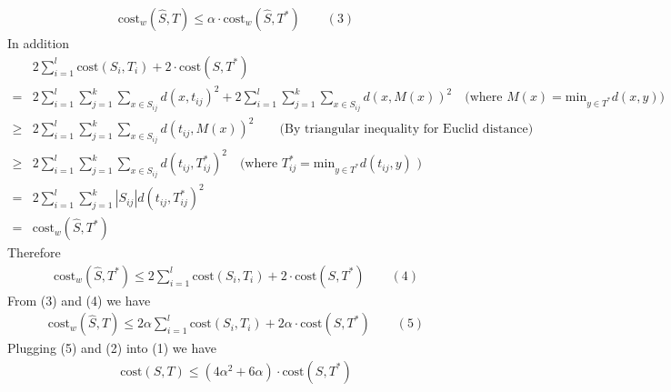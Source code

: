 \documentclass[12pt]{article}
\begin{document}
\begin{enumerate}[label=(\alph*)]
	\begin{align*}
		\text{cost}_w(\hat{S}, T) \leq \alpha \cdot \text{cost}_w(\hat{S}, T^*) \qquad (3)
	\end{align*}
	In addition
	\begin{align*}
		&2\sum_{i=1}^l\text{cost}(S_i, T_i) + 2 \cdot \text{cost}(S, T^*) \\
		=&2\sum_{i=1}^l\sum_{j=1}^k\sum_{x \in S_{ij}}d(x, t_{ij})^2 + 2\sum_{i=1}^l\sum_{j=1}^k\sum_{x \in S_{ij}}d(x, M(x))^2 \quad \text{(where $M(x) = \text{min}_{y \in T^*}d(x, y)$)} \\
		\geq&2\sum_{i=1}^l\sum_{j=1}^k\sum_{x \in S_{ij}}d(t_{ij}, M(x))^2 \qquad \text{(By triangular inequality for Euclid distance)} \\
		\geq&2\sum_{i=1}^l\sum_{j=1}^k\sum_{x \in S_{ij}}d(t_{ij}, T^*_{ij})^2 \quad \text{(where $T^*_{ij}=\text{min}_{y \in T^*}d(t_{ij}, y)$ )} \\
		=&2\sum_{i=1}^l\sum_{j=1}^k|S_{ij}|d(t_{ij}, T^*_{ij})^2 \\
		=&\text{cost}_w(\hat{S}, T^*)
	\end{align*}
	Therefore
	\begin{align*}
		\text{cost}_w(\hat{S}, T^*) \leq 2\sum_{i=1}^l\text{cost}(S_i, T_i) + 2 \cdot \text{cost}(S, T^*) \qquad (4)
	\end{align*}
	From (3) and (4) we have
	\begin{align*}
		\text{cost}_w(\hat{S}, T) \leq 2\alpha\sum_{i=1}^l\text{cost}(S_i, T_i) + 2 \alpha \cdot \text{cost}(S, T^*) \qquad (5)
	\end{align*}
	Plugging (5) and (2) into (1) we have
	\begin{align*}
		\text{cost}(S, T) \leq (4\alpha^2 + 6\alpha)\cdot\text{cost}(S, T^*)
	\end{align*}
\end{enumerate}
\end{document}

